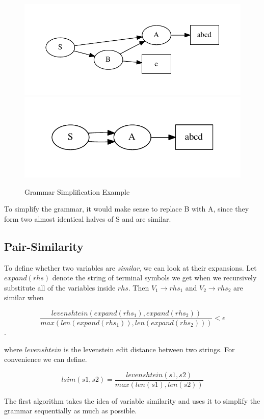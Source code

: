 \documentclass[11pt]{article}
\begin{document}
\begin{figure}[t]
\centering
\includegraphics[scale=0.6]{sred1.pdf}
\includegraphics[scale=0.6]{sred2.pdf}
\caption{Grammar Simplification Example}
\label{sred}
\end{figure}

To simplify the grammar, it would make sense to replace B with A, since
they form two almost identical halves of S and are similar.

\subsection{Pair-Similarity}

To define whether two variables are \emph{similar}, we can look at their
expansions. Let $expand(rhs)$ denote the string of terminal symbols we get
when we recursively substitute all of the variables inside $rhs$. Then
$V_1 \rightarrow rhs_1$ and $V_2 \rightarrow rhs_2$ are similar when

$$\frac{levenshtein(expand(rhs_1),expand(rhs_2))}
        {max(len(expand(rhs_1)),len(expand(rhs_2)))} < \epsilon$$.

where $levenshtein$ is the levenstein edit distance between two strings.
For convenience we can define.

$$lsim(s1,s2) = \frac{levenshtein(s1,s2)}{max(len(s1),len(s2))}$$

The first algorithm takes the idea of variable similarity and uses it
to simplify the grammar sequentially as much as possible.
\end{document}
